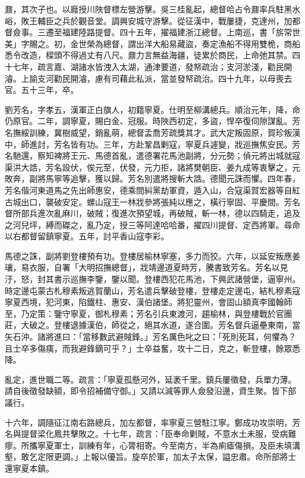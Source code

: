 \begin{pinyinscope}
鼐，其次子也。以廕授川陜督標左營游擊。吳三桂亂起，總督哈占令鼐率兵駐黑水峪，敗王輔臣之兵於觀音堂。調興安城守游擊。從征漢中，戰屢捷，克達州，加都督僉事。三遷至福建陸路提督。四十五年，擢福建浙江總督。上南巡，書「旂常世美」字賜之。初，金世榮為總督，謂出洋大船易藏盜，奏定漁船不得用雙桅，商船悉令改造，樑頭不得過丈有八尺。鼐力言無益海疆，徒累於商民，上命弛其禁。四十七年，疏言嘉、湖諸水皆洩入太湖，通津要道，發帑疏治；支河淤淺，勸民開濬。上諭支河勸民開濬，慮有司藉此私派，當並發帑疏治。四十九年，以母喪去官。五十三年，卒。

劉芳名，字孝五，漢軍正白旗人，初籍寧夏。仕明至柳溝總兵。順治元年，降，命仍原官。二年，調寧夏，賜白金、冠服。時陜西初定，多盜，悍卒復伺隙謀亂。芳名撫綏訓練，冀樹威望，銷亂萌，總督孟喬芳疏獎其才。武大定叛固原，賀珍叛漢中，師進討，芳名皆有功。三年，方赴鞏昌剿寇，寧夏兵遽變，戕巡撫焦安民。芳名馳還，察知裨將王元、馬德首亂，遣德署花馬池副將，分元勢；偵元將出城就寇渠洪大誥，芳名設伏，俟元至，伏發，元力拒，諸將樊朝臣、姜九成等衷擊之，元敗奔，副將馬寧等追擊，獲以歸。芳名別遣將搜斬大誥。德聞元誅而懼。四年春，芳名偕河東道馬之先出師惠安，德乘間糾黨劫軍資，遁入山，合寇渠賀宏器等自紅古城出口，襲破安定。螺山寇王一林戕參將張純以應之，橫行寧固、平慶間。芳名督所部兵進次亂麻川，破賊；復進次預望城，再破賊，斬一林，德以四騎走，追及之河兒坪，縛而磔之，亂乃定，授三等阿達哈哈番，擢四川提督、定西將軍。尋命以右都督留鎮寧夏。五年，討平香山寇李彩。

馬德之誅，副將劉登樓預有功。登樓居榆林寧塞，多力而狡。六年，以延安叛應姜瓖，易衣服，自署「大明招撫總督」，戕靖邊道夏時芳，騰書致芳名。芳名以見汙，怒，封其書示巡撫李鑒，鑒以聞。登樓西犯花馬池，下興武諸營堡，逼寧州。時定邊屯蒙古札穆素叛逃賀蘭山，芳名遣兵擊破登樓，登樓走定邊屯，結札穆素寇寧夏西境，犯河東，陷鐵柱、惠安、漢伯諸堡。將犯靈州，會固山額真李國翰師至，乃定策：鑒守寧夏，御札穆素；芳名引兵東渡河，趨榆林，與登樓戰於官團莊，大破之。登樓退據漢伯，師從之，絕其水道，遂合圍。芳名督兵逼壘東南，當矢石沖。諸將進曰：「當移數武避賊鋒。」芳名厲色叱之曰：「死則死耳，何懼為？且士卒多傷痍，而我避鋒鏑可乎？」士卒益奮，攻十二日，克之，斬登樓，餘眾悉降。

亂定，進世職二等。疏言：「寧夏孤懸河外，延袤千里。鎮兵屢徵發，兵單力薄。請自後徵發缺額，即令招補備守御。」又請以減等罪人僉發沿邊，資生聚。皆下部議行。

十六年，調隨征江南右路總兵，加左都督，率寧夏三營駐江寧。鄭成功攻崇明，芳名與提督梁化鳳共擊敗之。十七年，疏言：「臣奉命剿賊，不意水土未服，受病難瘳。所攜寧夏軍士，訓練有年，心膂相寄。今至南方，半為痢瘧傷損。及臣未填溝壑，敢乞定限更調。」上報以優旨。旋卒於軍，加太子太保，謚忠肅。命所部將士還寧夏本鎮。


\end{pinyinscope}
